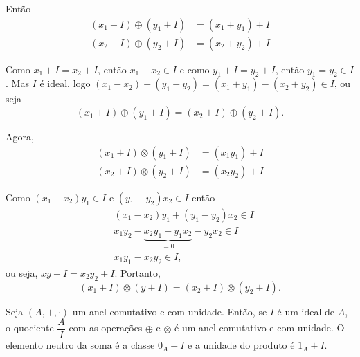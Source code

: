 Então
\begin{align*}
    (x_1 + I) \oplus (y_1 + I) &= (x_1 + y_1) + I\\
    (x_2 + I) \oplus (y_2 + I) &= (x_2 + y_2) + I
\end{align*}

Como $x_1 + I = x_2 + I$, então $x_1 - x_2 \in I$ e como $y_1 + I = y_2 + I$, então $y_1 = y_2 \in I$. Mas $I$ é ideal, logo $(x_1 - x_2) + (y_1 - y_2) = (x_1 + y_1)
- (x_2 + y_2) \in I$, ou seja
\[
    (x_1 + I) \oplus (y_1 + I) = (x_2 + I) \oplus (y_2 + I).
\]

Agora,
\begin{align*}
    (x_1 + I) \otimes (y_1 + I) &= (x_1y_1) + I\\
    (x_2 + I) \otimes (y_2 + I) &= (x_2y_2) + I
\end{align*}

Como $(x_1 - x_2)y_1 \in I$ e $(y_1 - y_2)x_2 \in I$ então
\begin{align*}
    &(x_1 - x_2)y_1 + (y_1 - y_2)x_2 \in I\\
    &x_1y_2-\underbrace{x_2y_1 + y_1x_2}_{= 0} - y_2x_2 \in I\\
    &x_1y_1 - x_2y_2\in I,
\end{align*}
ou seja, $xy + I = x_2y_2 + I$. Portanto,
\[
    (x_1 + I) \otimes (y + I) = (x_2 + I) \otimes (y_2 + I).
\]

\begin{teorema}
    Seja $(A, +, \cdot)$ um anel comutativo e com unidade. Então, se $I$ é um ideal de $A$, o quociente $\dfrac{A}{I}$ com as operações $\oplus$ e $\otimes$
    é um anel comutativo e com unidade. O elemento neutro da soma é a classe $0_{A} + I$ e a unidade do produto é $1_{A} + I$.
\end{teorema}
